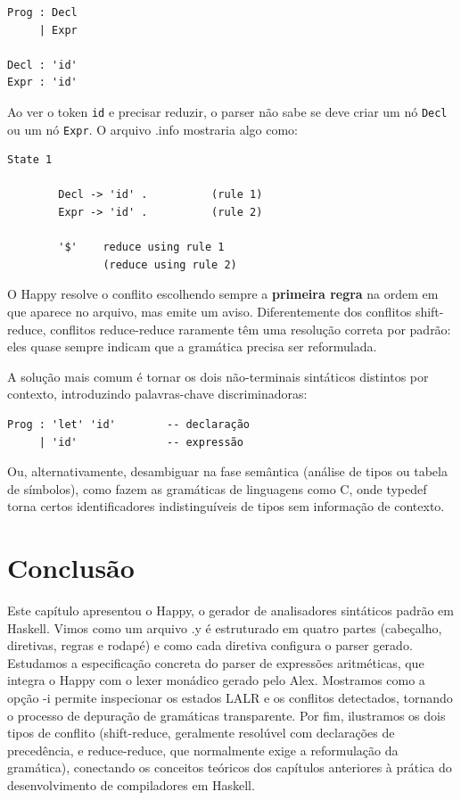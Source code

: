 \begin{verbatim}
Prog : Decl
     | Expr

Decl : 'id'
Expr : 'id'
\end{verbatim}

Ao ver o token \verb|id| e precisar reduzir, o
parser não sabe se deve criar um nó \verb|Decl| ou
um nó \verb|Expr|. O arquivo
.info mostraria algo como:

\begin{verbatim}
State 1

        Decl -> 'id' .          (rule 1)
        Expr -> 'id' .          (rule 2)

        '$'    reduce using rule 1
               (reduce using rule 2)
\end{verbatim}

O Happy resolve o conflito escolhendo sempre a \textbf{primeira
regra} na ordem em que aparece no arquivo, mas emite um aviso.
Diferentemente dos conflitos shift-reduce, conflitos reduce-reduce
raramente têm uma resolução correta por padrão: eles quase sempre
indicam que a gramática precisa ser reformulada.

A solução mais comum é tornar os dois não-terminais sintáticos
distintos por contexto, introduzindo palavras-chave discriminadoras:

\begin{verbatim}
Prog : 'let' 'id'        -- declaração
     | 'id'              -- expressão
\end{verbatim}

Ou, alternativamente, desambiguar na fase semântica (análise de tipos
ou tabela de símbolos), como fazem as gramáticas de linguagens como
C, onde typedef torna certos
identificadores indistinguíveis de tipos sem informação de contexto.

\section{Conclusão}

Este capítulo apresentou o Happy, o gerador de analisadores
sintáticos padrão em Haskell. Vimos como um arquivo
.y é estruturado em quatro partes
(cabeçalho, diretivas, regras e rodapé) e como cada diretiva
configura o parser gerado. Estudamos a especificação concreta do
parser de expressões aritméticas, que integra o Happy com o lexer
monádico gerado pelo Alex. Mostramos como a opção
-i permite inspecionar os estados LALR e os
conflitos detectados, tornando o processo de depuração de gramáticas
transparente. Por fim, ilustramos os dois tipos de conflito
(shift-reduce, geralmente resolúvel com declarações de precedência, e
reduce-reduce, que normalmente exige a reformulação da gramática),
conectando os conceitos teóricos dos capítulos anteriores à prática
do desenvolvimento de compiladores em Haskell.
